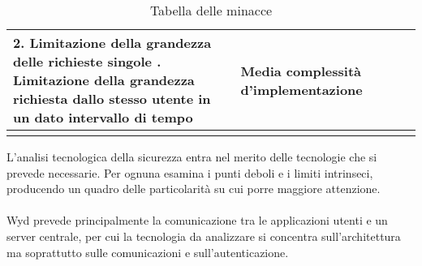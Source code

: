 \begin{longtable}{|P{3.3cm}|P{1.6cm}|P{6.2cm}|P{4cm}|}
    2. Limitazione della grandezza delle richieste singole . Limitazione della grandezza richiesta dallo stesso utente in un dato intervallo di tempo & Media complessità d'implementazione                                                                                                                                                                     \\
    \hline
    \caption{Tabella delle minacce}
\end{longtable}

\clearpage

L'analisi tecnologica della sicurezza entra nel merito delle tecnologie che si prevede necessarie.
Per ognuna esamina i punti deboli e i limiti intrinseci,
producendo un quadro delle particolarità su cui porre maggiore attenzione.\\
\\
Wyd prevede principalmente la comunicazione tra le applicazioni utenti e un server centrale,
per cui la tecnologia da analizzare si concentra sull'architettura
ma soprattutto sulle comunicazioni e sull'autenticazione.\\


